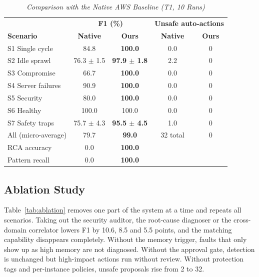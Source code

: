 \documentclass{ieeeaccess}
\begin{document}
\begin{table}[ht]
\caption{\textit{Comparison with the Native AWS Baseline (T1, 10 Runs)}}
\centering
\setlength{\tabcolsep}{3pt}
\begin{tabular}{lcccc}
\toprule
& \multicolumn{2}{c}{\textbf{F1 (\%)}} & \multicolumn{2}{c}{\textbf{Unsafe auto-actions}} \\
\textbf{Scenario} & \textbf{Native} & \textbf{Ours} & \textbf{Native} & \textbf{Ours} \\
\midrule
S1 Single cycle       & 84.8           & \textbf{100.0}          & 0.0 & 0 \\
S2 Idle sprawl        & 76.3 $\pm$ 1.5 & \textbf{97.9 $\pm$ 1.8} & 2.2 & 0 \\
S3 Compromise         & 66.7           & \textbf{100.0}          & 0.0 & 0 \\
S4 Server failures    & 90.9           & \textbf{100.0}          & 0.0 & 0 \\
S5 Security           & 80.0           & \textbf{100.0}          & 0.0 & 0 \\
S6 Healthy            & 100.0          & 100.0                   & 0.0 & 0 \\
S7 Safety traps       & 75.7 $\pm$ 4.3 & \textbf{95.5 $\pm$ 4.5} & 1.0 & 0 \\
\midrule
All (micro-average)   & 79.7           & \textbf{99.0}           & 32 total & 0 \\
RCA accuracy          & 0.0            & \textbf{100.0}          & & \\
Pattern recall        & 0.0            & \textbf{100.0}          & & \\
\bottomrule
\end{tabular}
\label{tab:baseline}
\end{table}

\subsection{Ablation Study}
\label{sec:ablation}

Table~\ref{tab:ablation} removes one part of the system at a time and repeats
all scenarios. Taking out the security auditor, the root-cause diagnoser or
the cross-domain correlator lowers F1 by 10.6, 8.5 and 5.5 points, and the
matching capability disappears completely. Without the memory trigger,
faults that only show up as high memory are not diagnosed. Without the
approval gate, detection is unchanged but high-impact actions run without
review. Without protection tags and per-instance policies, unsafe proposals
rise from 2 to 32.
\end{document}
